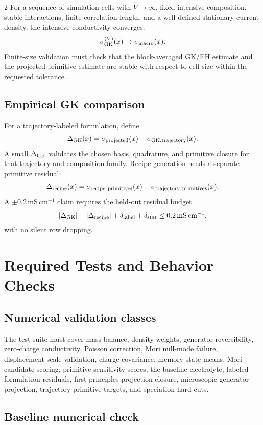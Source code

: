 \documentclass[10pt]{article}
\begin{document}
\begin{multicols}{2}
For a sequence of simulation cells with \(V\to\infty\), fixed intensive
composition, stable interactions, finite correlation length, and a well-defined
stationary current density, the intensive conductivity converges:
\[
\sigma_{\rm GK}^{(V)}(x)\to\sigma_{\rm macro}(x).
\]
Finite-size validation must check that the block-averaged GK/EH estimate and
the projected primitive estimate are stable with respect to cell size within the
requested tolerance.

\subsection{Empirical GK comparison}

For a trajectory-labeled formulation, define
\[
\Delta_{\rm GK}(x)
=
\sigma_{\rm projected}(x)-\sigma_{\rm GK,trajectory}(x).
\]
A small \(\Delta_{\rm GK}\) validates the chosen basis, quadrature, and
primitive closure for that trajectory and composition family. Recipe generation
needs a separate primitive residual:
\[
\Delta_{\rm recipe}(x)
=
\sigma_{\rm recipe\ primitives}(x)
-\sigma_{\rm trajectory\ primitives}(x).
\]
A \(\pm0.2\,\mathrm{mS\,cm^{-1}}\) claim requires the held-out residual budget
\[
|\Delta_{\rm GK}|+|\Delta_{\rm recipe}|+\delta_{\rm label}+\delta_{\rm stat}
\leq 0.2\,\mathrm{mS\,cm^{-1}},
\]
with no silent row dropping.

\section{Required Tests and Behavior Checks}

\subsection{Numerical validation classes}

The test suite must cover mass balance, density weights, generator reversibility,
zero-charge conductivity, Poisson correction, Mori null-mode failure,
displacement-scale validation, charge covariance, memory state means, Mori
candidate scoring, primitive sensitivity scores, the baseline electrolyte, labeled
formulation residuals, first-principles projection closure, microscopic
generator projection, trajectory primitive targets, and speciation hard cuts.

\subsection{Baseline numerical check}


\end{multicols}
\end{document}
